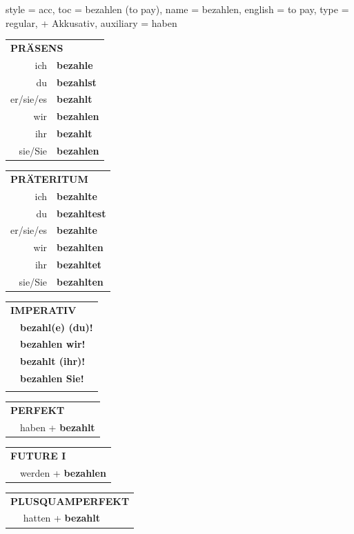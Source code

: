 \begin{verbentry}{
  style = {acc},
  toc = {bezahlen (to pay)},
  name = {bezahlen},
  english = {to pay},
  type = {regular, + Akkusativ},
  auxiliary = {haben}
}
  \begin{tabular}{rl}
     \multicolumn{2}{l}{\textbf{PRÄSENS} }\\
    ich & \textbf{bezahle}\\
    du & \textbf{bezahlst}\\
    er/sie/es & \textbf{bezahlt}\\
    wir & \textbf{bezahlen}\\
    ihr & \textbf{bezahlt}\\
    sie/Sie & \textbf{bezahlen}\\
  \end{tabular}
  \hfill
     \begin{tabular}{rl}
    \multicolumn{2}{l}{\textbf{PRÄTERITUM} }\\
    ich & \textbf{bezahlte}\\
    du & \textbf{bezahltest}\\
    er/sie/es & \textbf{bezahlte}\\
    wir & \textbf{bezahlten}\\
    ihr & \textbf{bezahltet}\\
    sie/Sie & \textbf{bezahlten}\\
  \end{tabular}
  \hfill
  \begin{tabular}{rl}
     \multicolumn{2}{l}{\textbf{IMPERATIV} }\\
   & \textbf{bezahl(e) (du)!}\\
   & \textbf{bezahlen wir!}\\
   & \textbf{bezahlt (ihr)!}\\
   & \textbf{bezahlen Sie!}\\
   & \vspace{10pt}
  \end{tabular}

    \vspace{10pt}

 \begin{tabular}{rl}
     \multicolumn{2}{l}{\textbf{PERFEKT}}\\
  &  haben + \textbf{bezahlt}\\
  \end{tabular}
\hfill
   \begin{tabular}{rl}
   
    \multicolumn{2}{l}{\textbf{FUTURE I} }\\
  &  werden + \textbf{bezahlen}\\
 
  \end{tabular}
\hfill
   \begin{tabular}{rl}
      \multicolumn{2}{l}{\textbf{PLUSQUAMPERFEKT}}\\
  &  hatten + \textbf{bezahlt}\\
  \end{tabular}
  

\end{verbentry}
